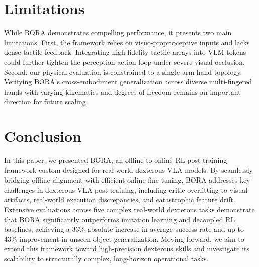 \documentclass{article}
\begin{document}
\vspace{-2.5mm}
\section{Limitations}
\vspace{-1.5mm}
\label{sec:limitations}
While BORA demonstrates compelling performance, it presents two main limitations. First, the framework relies on visuo-proprioceptive inputs and lacks dense tactile feedback. Integrating high-fidelity tactile arrays into VLM tokens could further tighten the perception-action loop under severe visual occlusion. Second, our physical evaluation is constrained to a single arm-hand topology. Verifying BORA's cross-embodiment generalization across diverse multi-fingered hands with varying kinematics and degrees of freedom remains an important direction for future scaling.

\vspace{-2.5mm}
\section{Conclusion}
\vspace{-1.5mm}
\label{sec:conclusion}
In this paper, we presented BORA, an offline-to-online RL post-training framework custom-designed for real-world dexterous VLA models. By seamlessly bridging offline alignment with efficient online fine-tuning, BORA addresses key challenges in dexterous VLA post-training, including critic overfitting to visual artifacts, real-world execution discrepancies, and catastrophic feature drift. 
Extensive evaluations across five complex real-world dexterous tasks demonstrate that BORA significantly outperforms imitation learning and decoupled RL baselines, achieving a 33\% absolute increase in average success rate and up to 43\% improvement in unseen object generalization. 
Moving forward, we aim to extend this framework toward high-precision dexterous skills and investigate its scalability to structurally complex, long-horizon operational tasks.
\appendix
\newpage
\end{document}
